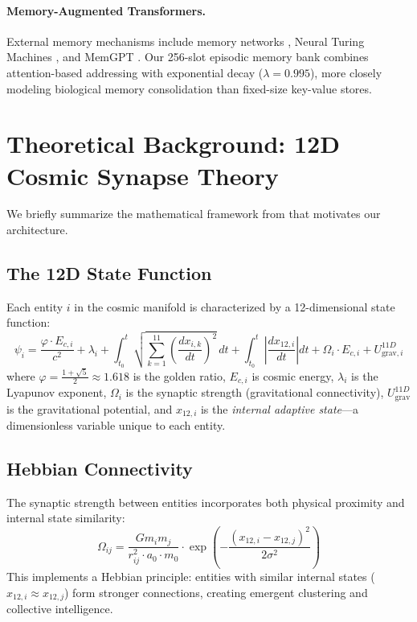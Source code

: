 \documentclass[11pt,a4paper]{article}
\begin{document}
\paragraph{Memory-Augmented Transformers.}
External memory mechanisms include memory networks \citep{sukhbaatar2015end}, Neural Turing Machines \citep{graves2014neural}, and MemGPT \citep{packer2023memgpt}. Our 256-slot episodic memory bank combines attention-based addressing with exponential decay ($\lambda = 0.995$), more closely modeling biological memory consolidation than fixed-size key-value stores.

\section{Theoretical Background: 12D Cosmic Synapse Theory}
\label{sec:theory}

We briefly summarize the mathematical framework from \citet{davis2024cst} that motivates our architecture.

\subsection{The 12D State Function}

Each entity $i$ in the cosmic manifold is characterized by a 12-dimensional state function:
\begin{equation}
    \psi_i = \frac{\varphi \cdot E_{c,i}}{c^2} + \lambda_i + \int_{t_0}^{t} \sqrt{\sum_{k=1}^{11} \left(\frac{dx_{i,k}}{dt}\right)^2} \, dt + \int_{t_0}^{t} \left|\frac{dx_{12,i}}{dt}\right| dt + \Omega_i \cdot E_{c,i} + U_{\text{grav},i}^{11D}
    \label{eq:psi}
\end{equation}
where $\varphi = \frac{1+\sqrt{5}}{2} \approx 1.618$ is the golden ratio, $E_{c,i}$ is cosmic energy, $\lambda_i$ is the Lyapunov exponent, $\Omega_i$ is the synaptic strength (gravitational connectivity), $U_{\text{grav}}^{11D}$ is the gravitational potential, and $x_{12,i}$ is the \emph{internal adaptive state}---a dimensionless variable unique to each entity.

\subsection{Hebbian Connectivity}

The synaptic strength between entities incorporates both physical proximity and internal state similarity:
\begin{equation}
    \Omega_{ij} = \frac{Gm_im_j}{r_{ij}^2 \cdot a_0 \cdot m_0} \cdot \exp\!\left(-\frac{(x_{12,i} - x_{12,j})^2}{2\sigma^2}\right)
    \label{eq:omega}
\end{equation}
This implements a Hebbian principle: entities with similar internal states ($x_{12,i} \approx x_{12,j}$) form stronger connections, creating emergent clustering and collective intelligence.
\end{document}
